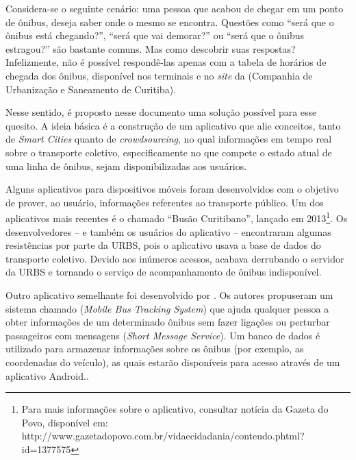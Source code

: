 Considera-se o seguinte cenário: uma pessoa que acabou de chegar em um ponto de ônibus, deseja saber onde o mesmo se encontra. Questões como ``será que o ônibus está chegando?'', ``será que vai demorar?'' ou ``será que o ônibus estragou?'' são bastante comuns. Mas como descobrir suas respostas? Infelizmente, não é possível respondê-las apenas com a tabela de horários de chegada dos ônibus, disponível nos terminais e no \textit{site} da  (Companhia de Urbanização e Saneamento de Curitiba).

Nesse sentido, é proposto nesse documento uma solução possível para esse quesito. A ideia básica é a construção de um aplicativo que alie conceitos, tanto de \textit{Smart Cities} quanto de \textit{crowdsourcing}, no qual informações em tempo real sobre o transporte coletivo, especificamente no que compete o estado atual de uma linha de ônibus, sejam disponibilizadas aos usuários.


Alguns aplicativos para dispositivos móveis foram desenvolvidos com o objetivo de prover, ao usuário, informações referentes ao transporte público. Um dos aplicativos mais recentes é o chamado ``Busão Curitibano'', lançado em 2013\footnote{Para mais informações sobre o aplicativo, consultar notícia da Gazeta do Povo, disponível em:  http://www.gazetadopovo.com.br/vidaecidadania/conteudo.phtml?id=1377575}. Os desenvolvedores -- e também os usuários do aplicativo -- encontraram algumas resistências por parte da URBS, pois o aplicativo usava a base de dados do transporte coletivo. Devido aos inúmeros acessos, acabava derrubando o servidor da URBS e tornando o serviço de acompanhamento de ônibus indisponível.

Outro aplicativo semelhante foi desenvolvido por . Os autores propuseram um sistema chamado  (\emph{Mobile Bus Tracking System}) que ajuda qualquer pessoa a obter informações de um determinado ônibus sem fazer ligações ou perturbar passageiros com mensagens  (\emph{Short Message Service}). %
Um banco de dados é utilizado para armazenar informações sobre os ônibus (por exemplo, as coordenadas do veículo), as quais estarão disponíveis para acesso através de um aplicativo Android..

